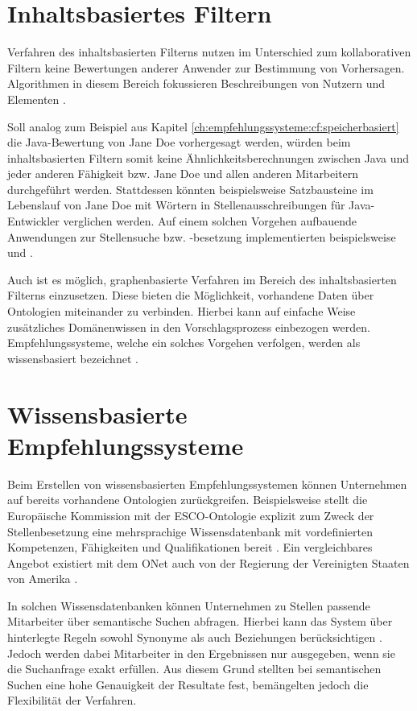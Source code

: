 \section{Inhaltsbasiertes Filtern}
\label{ch:empfehlungssysteme:inhaltsbasiertesFiltern}
Verfahren des inhaltsbasierten Filterns nutzen im Unterschied zum kollaborativen Filtern keine Bewertungen anderer Anwender zur Bestimmung von Vorhersagen. Algorithmen in diesem Bereich fokussieren Beschreibungen von Nutzern und Elementen \cite[S. 139f.]{recommenderSystems:2016}.

Soll analog zum Beispiel aus Kapitel \ref{ch:empfehlungssysteme:cf:speicherbasiert} die Java-Bewertung von Jane Doe vorhergesagt werden, würden beim inhaltsbasierten Filtern somit keine Ähnlichkeitsberechnungen zwischen Java und jeder anderen Fähigkeit bzw. Jane Doe und allen anderen Mitarbeitern durchgeführt werden. Stattdessen könnten beispielsweise Satzbausteine im Lebenslauf von Jane Doe mit Wörtern in Stellenausschreibungen für Java-Entwickler verglichen werden. Auf einem solchen Vorgehen aufbauende Anwendungen zur Stellensuche bzw. -besetzung implementierten beispielsweise \textcite[S. 4ff.]{guo:2016} und \textcite[S. 3ff.]{prospect:2010}.

Auch ist es möglich, graphenbasierte Verfahren im Bereich des inhaltsbasierten Filterns  einzusetzen. Diese bieten die Möglichkeit, vorhandene Daten über Ontologien miteinander zu verbinden. Hierbei kann auf einfache Weise zusätzliches Domänenwissen in den Vorschlagsprozess einbezogen werden. Empfehlungssysteme, welche ein solches Vorgehen verfolgen, werden als wissensbasiert bezeichnet \cite[S. 168f.]{recommenderSystems:2016}.
\newpage
\section{Wissensbasierte Empfehlungssysteme}
\label{ch:empfehlungssysteme:wissensbasierteAnsaetze}
Beim Erstellen von wissensbasierten Empfehlungssystemen können Unternehmen auf bereits vorhandene Ontologien zurückgreifen. Beispielsweise stellt die Europäische Kommission mit der \ac{ESCO}-Ontologie explizit zum Zweck der Stellenbesetzung eine mehrsprachige Wissensdatenbank mit vordefinierten Kompetenzen, Fähigkeiten und Qualifikationen bereit \cite[S. 1ff.]{leVrang:2014}. Ein vergleichbares Angebot existiert mit dem \ac{ONet} auch von der Regierung der Vereinigten Staaten von Amerika \cite[S. 2]{aCombinedRepresentation:2018}.

In solchen Wissensdatenbanken können Unternehmen zu Stellen passende Mitarbeiter über semantische Suchen abfragen. Hierbei kann das System über hinterlegte Regeln sowohl Synonyme als auch Beziehungen berücksichtigen \cite[S. 2f.]{singto:2013}. Jedoch werden dabei Mitarbeiter in den Ergebnissen nur ausgegeben, wenn sie die Suchanfrage exakt erfüllen. Aus diesem Grund stellten \textcite[S. 3]{bianchini:2008} bei semantischen Suchen eine hohe Genauigkeit der Resultate fest, bemängelten jedoch die Flexibilität der Verfahren.

